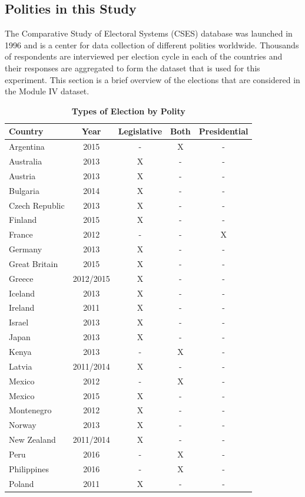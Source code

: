 \documentclass[12pt, titlepage]{article}
\newcommand\tb{\textbf}
\begin{document}
\subsection{Polities in this Study}

The Comparative Study of Electoral Systems (CSES) database was launched in 1996 and is a center for data collection of different polities worldwide. Thousands of respondents are interviewed per election cycle in each of the countries and their responses are aggregated to form the dataset that is used for this experiment. This section is a brief overview of the elections that are considered in the Module IV dataset.

\begin{table}
	\centering
	\caption{\tb{Types of Election by Polity}}
	\begin{tabulary}{\textwidth}{l c c c c} 
		\hline
		\tb{Country}&\tb{Year}&\tb{Legislative}&\tb{Both}&\tb{Presidential}\\
		\hline
		Argentina&2015&-&X&-\\
		Australia&2013&X&-&-\\
		Austria&2013&X&-&-\\
		Bulgaria&2014&X&-&-\\
		Czech Republic&2013&X&-&-\\
		Finland&2015&X&-&-\\
		France&2012&-&-&X\\
		Germany&2013&X&-&-\\ 
		Great Britain&2015&X&-&-\\
		Greece&2012/2015&X&-&-\\
		Iceland&2013&X&-&-\\
		Ireland&2011&X&-&-\\
		Israel&2013&X&-&-\\
		Japan&2013&X&-&-\\
		Kenya&2013&-&X&-\\
		Latvia&2011/2014&X&-&-\\
		Mexico&2012&-&X&-\\
		Mexico&2015&X&-&-\\
		Montenegro&2012&X&-&-\\
		Norway&2013&X&-&-\\
		New Zealand&2011/2014&X&-&-\\
		Peru&2016&-&X&-\\
		Philippines&2016&-&X&-\\
		Poland&2011&X&-&-\\

\end{tabulary}
\end{table}
\end{document}
